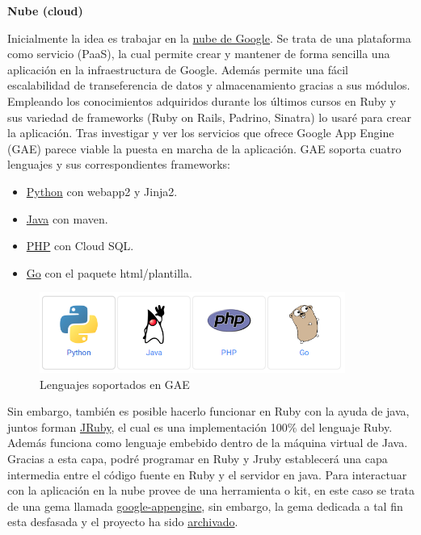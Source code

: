 \vspace*{0.3in}
\begin{LARGE}
	\textbf{{\huge Nube (cloud)}}
\end{LARGE}

\vspace*{0.1in}
Inicialmente la idea es trabajar en la \href{https://cloud.google.com/appengine/docs}{nube de Google}. Se trata de una plataforma como servicio (PaaS), la cual permite crear y mantener de forma sencilla una aplicación en la infraestructura de Google. Además permite una fácil escalabilidad de transeferencia de datos y almacenamiento gracias a sus módulos.\\

Empleando los conocimientos adquiridos durante los últimos cursos en Ruby y sus variedad de frameworks (Ruby on Rails, Padrino, Sinatra) lo usaré para crear la aplicación. Tras investigar y ver los servicios que ofrece Google App Engine (GAE) parece viable la puesta en marcha de la aplicación. GAE soporta cuatro lenguajes y sus correspondientes frameworks:
\begin{itemize}
	\item \href{https://cloud.google.com/appengine/docs/python/gettingstartedpython27/introduction}{Python} con webapp2 y Jinja2.
	\item \href{https://cloud.google.com/appengine/docs/java/gettingstarted/introduction}{Java} con maven.
	\item \href{https://cloud.google.com/appengine/docs/php/gettingstarted/introduction}{PHP} con Cloud SQL.
	\item \href{https://cloud.google.com/appengine/docs/go/gettingstarted/introduction}{Go} con el paquete html/plantilla. 
\end{itemize}

\begin{figure}[H]
	\centering
		\includegraphics[width=10cm]{./images/lenguajes-GAE.png}
		\caption{Lenguajes soportados en GAE} \label{fig:lenguajes-GAE}
\end{figure}

Sin embargo, también es posible hacerlo funcionar en Ruby con la ayuda de java, juntos forman \href{http://jruby.org/}{JRuby}, el cual es una implementación 100\% del lenguaje Ruby. Además funciona como lenguaje embebido dentro de la máquina virtual de Java. Gracias a esta capa, podré programar en Ruby y Jruby establecerá una capa intermedia entre el código fuente en Ruby y el servidor en java. Para interactuar con la aplicación en la nube provee de una herramienta o kit, en este caso se trata de una gema llamada \href{https://rubygems.org/gems/google-appengine}{google-appengine}, sin embargo, la gema
dedicada a tal fin esta desfasada y el proyecto ha sido \href{https://code.google.com/p/appengine-jruby/}{archivado}.\\

